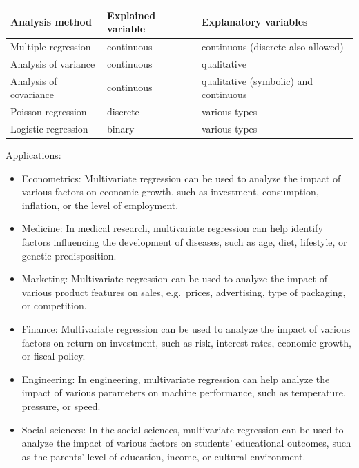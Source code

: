 \documentclass[
  english,
  letterpaper,
  DIV=11,
  numbers=noendperiod]{scrreprt}
\newcounter{none} %
\begin{document}
{\def\LTcaptype{none} %
\begin{longtable}[]{@{}
  >{\raggedright\arraybackslash}p{}
  >{\raggedright\arraybackslash}p{}
  >{\raggedright\arraybackslash}p{}@{}}
\toprule\noalign{}
\begin{minipage}[b]{\linewidth}\raggedright
Analysis method
\end{minipage} & \begin{minipage}[b]{\linewidth}\raggedright
Explained variable
\end{minipage} & \begin{minipage}[b]{\linewidth}\raggedright
Explanatory variables
\end{minipage} \\
\midrule\noalign{}
\endhead
\bottomrule\noalign{}
\endlastfoot
Multiple regression & continuous & continuous (discrete also allowed) \\
Analysis of variance & continuous & qualitative \\
Analysis of covariance & continuous & qualitative (symbolic) and
continuous \\
Poisson regression & discrete & various types \\
Logistic regression & binary & various types \\
\end{longtable}
}

Applications:

\begin{itemize}
\item
  Econometrics: Multivariate regression can be used to analyze the
  impact of various factors on economic growth, such as investment,
  consumption, inflation, or the level of employment.
\item
  Medicine: In medical research, multivariate regression can help
  identify factors influencing the development of diseases, such as age,
  diet, lifestyle, or genetic predisposition.
\item
  Marketing: Multivariate regression can be used to analyze the impact
  of various product features on sales, e.g.~prices, advertising, type
  of packaging, or competition.
\item
  Finance: Multivariate regression can be used to analyze the impact of
  various factors on return on investment, such as risk, interest rates,
  economic growth, or fiscal policy.
\item
  Engineering: In engineering, multivariate regression can help analyze
  the impact of various parameters on machine performance, such as
  temperature, pressure, or speed.
\item
  Social sciences: In the social sciences, multivariate regression can
  be used to analyze the impact of various factors on students'
  educational outcomes, such as the parents' level of education, income,
  or cultural environment.
\end{itemize}
\end{document}
